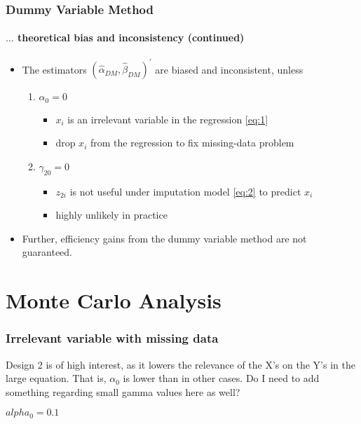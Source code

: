\documentclass[aspectratio=1610]{beamer}
\begin{document}
\begin{frame}
	\frametitle{Dummy Variable Method}
	\framesubtitle{$\ldots$ theoretical bias and inconsistency (continued)}
	\begin{itemize}
		\item<1-> The estimators $(\hat{\alpha}_{DM}, \hat{\beta}_{DM})^{\prime}$ are biased and inconsistent, unless
		\begin{enumerate}
			\item<2-> $\alpha_0 = 0$
			\begin{itemize}
				\item<2-> $x_i$ is an irrelevant variable in the regression \eqref{eq:1}
				\item<2-> drop $x_i$ from the regression to fix missing-data problem
			\end{itemize}
			\item<3-> $\gamma_{20} = 0$
			\begin{itemize}
				\item<3-> $z_{2i}$ is not useful under imputation model \eqref{eq:2} to predict $x_i$
				\item<3-> highly unlikely in practice
			\end{itemize}
		\end{enumerate}
		\item<4-> Further, efficiency gains from the dummy variable method are not guaranteed.
	\end{itemize}
\end{frame}

\section{Monte Carlo Analysis}

\begin{frame}
	\frametitle{Irrelevant variable with missing data}
	Design 2 is of high interest, as it lowers the relevance of the X's on the Y's in the large equation. That is, $\alpha_0$ is lower than in other cases. Do I need to add something regarding small gamma values here as well?

	$alpha_0 = 0.1$
\end{frame}
\begin{frame}
    
\end{frame}
\end{document}
